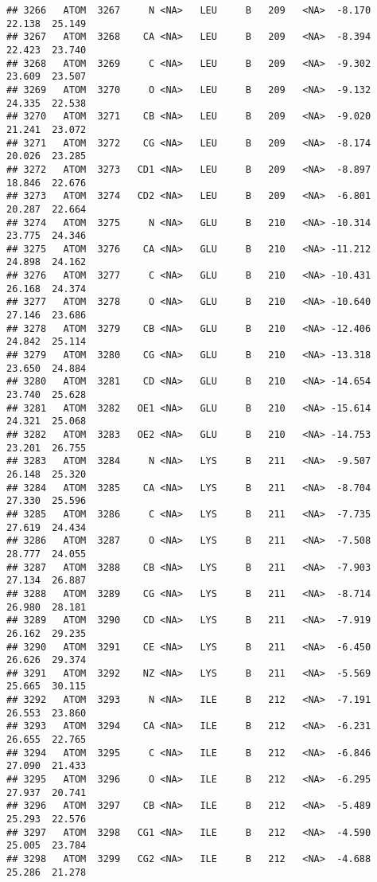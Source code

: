 \documentclass[
]{article}
\begin{document}
\begin{verbatim}
## 3266   ATOM  3267     N <NA>   LEU     B   209   <NA>  -8.170  22.138  25.149
## 3267   ATOM  3268    CA <NA>   LEU     B   209   <NA>  -8.394  22.423  23.740
## 3268   ATOM  3269     C <NA>   LEU     B   209   <NA>  -9.302  23.609  23.507
## 3269   ATOM  3270     O <NA>   LEU     B   209   <NA>  -9.132  24.335  22.538
## 3270   ATOM  3271    CB <NA>   LEU     B   209   <NA>  -9.020  21.241  23.072
## 3271   ATOM  3272    CG <NA>   LEU     B   209   <NA>  -8.174  20.026  23.285
## 3272   ATOM  3273   CD1 <NA>   LEU     B   209   <NA>  -8.897  18.846  22.676
## 3273   ATOM  3274   CD2 <NA>   LEU     B   209   <NA>  -6.801  20.287  22.664
## 3274   ATOM  3275     N <NA>   GLU     B   210   <NA> -10.314  23.775  24.346
## 3275   ATOM  3276    CA <NA>   GLU     B   210   <NA> -11.212  24.898  24.162
## 3276   ATOM  3277     C <NA>   GLU     B   210   <NA> -10.431  26.168  24.374
## 3277   ATOM  3278     O <NA>   GLU     B   210   <NA> -10.640  27.146  23.686
## 3278   ATOM  3279    CB <NA>   GLU     B   210   <NA> -12.406  24.842  25.114
## 3279   ATOM  3280    CG <NA>   GLU     B   210   <NA> -13.318  23.650  24.884
## 3280   ATOM  3281    CD <NA>   GLU     B   210   <NA> -14.654  23.740  25.628
## 3281   ATOM  3282   OE1 <NA>   GLU     B   210   <NA> -15.614  24.321  25.068
## 3282   ATOM  3283   OE2 <NA>   GLU     B   210   <NA> -14.753  23.201  26.755
## 3283   ATOM  3284     N <NA>   LYS     B   211   <NA>  -9.507  26.148  25.320
## 3284   ATOM  3285    CA <NA>   LYS     B   211   <NA>  -8.704  27.330  25.596
## 3285   ATOM  3286     C <NA>   LYS     B   211   <NA>  -7.735  27.619  24.434
## 3286   ATOM  3287     O <NA>   LYS     B   211   <NA>  -7.508  28.777  24.055
## 3287   ATOM  3288    CB <NA>   LYS     B   211   <NA>  -7.903  27.134  26.887
## 3288   ATOM  3289    CG <NA>   LYS     B   211   <NA>  -8.714  26.980  28.181
## 3289   ATOM  3290    CD <NA>   LYS     B   211   <NA>  -7.919  26.162  29.235
## 3290   ATOM  3291    CE <NA>   LYS     B   211   <NA>  -6.450  26.626  29.374
## 3291   ATOM  3292    NZ <NA>   LYS     B   211   <NA>  -5.569  25.665  30.115
## 3292   ATOM  3293     N <NA>   ILE     B   212   <NA>  -7.191  26.553  23.860
## 3293   ATOM  3294    CA <NA>   ILE     B   212   <NA>  -6.231  26.655  22.765
## 3294   ATOM  3295     C <NA>   ILE     B   212   <NA>  -6.846  27.090  21.433
## 3295   ATOM  3296     O <NA>   ILE     B   212   <NA>  -6.295  27.937  20.741
## 3296   ATOM  3297    CB <NA>   ILE     B   212   <NA>  -5.489  25.293  22.576
## 3297   ATOM  3298   CG1 <NA>   ILE     B   212   <NA>  -4.590  25.005  23.784
## 3298   ATOM  3299   CG2 <NA>   ILE     B   212   <NA>  -4.688  25.286  21.278

\end{verbatim}
\end{document}
